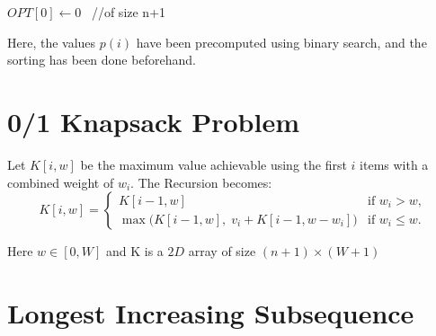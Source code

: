 \documentclass{article}
\begin{document}
	\begin{algorithm}[H]
		\SetAlgoLined
		\caption{Solution}
		$OPT[0] \leftarrow 0$ \, //of size n+1 \;
		\For{$i \leftarrow 1$ to $n$ }{
			$OPT[i] = max(OPT[i-1], v_i + OPT[p[(i)])$
		}
	\end{algorithm}
	\vspace{2mm}
	Here, the values $p(i)$ have been precomputed using binary search, and the sorting has been done beforehand.
	
	\section{0/1 Knapsack Problem}
	
	\begin{algorithm}[H]
		\SetAlgoLined
		\caption{Problem: 0/1 Knapsack}
	\end{algorithm}
	\vspace{5mm}
	
	Let $K[i,w]$ be the maximum value achievable using the first $i$ items with a combined weight of $w_i$. The Recursion becomes:
	\[
	K[i,w] =
	\begin{cases}
		K[i-1,w] & \text{if } w_i > w, \\[6pt]
		\max\big(K[i-1,w], \; v_i + K[i-1,w-w_i]\big) & \text{if } w_i \le w.
	\end{cases}
	\]
	
	Here $w \in [0,W]$ and K is a $2D$ array of size $(n+1) \times (W+1)$
	\vspace{2mm}
	
	\begin{algorithm}[H]
		\SetAlgoLined
		\caption{Solution}
		 \;
		 \;

		
	\end{algorithm}
	
	\section{Longest Increasing Subsequence}
	\begin{algorithm}[H]
		\SetAlgoLined
		\caption{Problem: LIS}
	\end{algorithm}
	\vspace{5mm}
	
\end{document}
